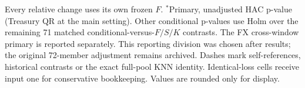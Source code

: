 \begin{table}[!htbp]
\begin{tabular}{rrlrrrr}
\bottomrule
\end{tabular}
\par\smallskip\begin{minipage}{\linewidth}\footnotesize Every relative change uses its own frozen $F$. $^{*}$Primary, unadjusted HAC p-value (Treasury QR at the main setting). Other conditional p-values use Holm over the remaining 71 matched conditional-versus-$F/S/K$ contrasts. The FX cross-window primary is reported separately. This reporting division was chosen after results; the original 72-member adjustment remains archived. Dashes mark self-references, historical contrasts or the exact full-pool KNN identity. Identical-loss cells receive input one for conservative bookkeeping. Values are rounded only for display.\end{minipage}
\end{table}
